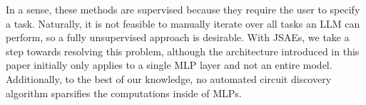 In a sense, these methods are supervised because they require the user to specify a task.
Naturally, it is not feasible to manually iterate over all tasks an LLM can perform, so a fully unsupervised approach is desirable.
With JSAEs, we take a step towards resolving this problem, although the architecture introduced in this paper initially only applies to a single MLP layer and not an entire model.
Additionally, to the best of our knowledge, no automated circuit discovery algorithm sparsifies the computations inside of MLPs.

%
